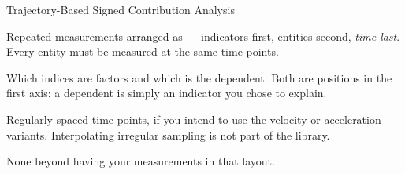 
\begin{recipe}[label=rec:trajectory-contributions]{Trajectory-Based Signed Contribution Analysis}


\nomaintainer

\begin{requiredinputs}
  \item Repeated measurements arranged as
         --- indicators first,
        entities second, \emph{time last}. Every entity must be measured at the
        same time points.
  \item Which indices are factors and which is the dependent. Both are
        positions in the first axis: a dependent is simply an indicator you
        chose to explain.
  \item Regularly spaced time points, if you intend to use the velocity or
        acceleration variants. Interpolating irregular sampling is not part of
        the library.
\end{requiredinputs}

\begin{prerequisites}
  \item None beyond having your measurements in that layout.
\end{prerequisites}


\end{recipe}
